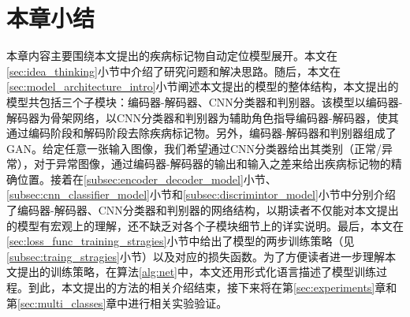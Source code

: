 \section{本章小结}\label{sec:chapter3_summary}
本章内容主要围绕本文提出的疾病标记物自动定位模型展开。本文在\ref{sec:idea_thinking}小节中介绍了研究问题和解决思路。随后，本文在\ref{sec:model_architecture_intro}小节阐述本文提出的模型的整体结构，本文提出的模型共包括三个子模块：编码器-解码器、CNN分类器和判别器。该模型以编码器-解码器为骨架网络，以CNN分类器和判别器为辅助角色指导编码器-解码器，使其通过编码阶段和解码阶段去除疾病标记物。另外，编码器-解码器和判别器组成了GAN。给定任意一张输入图像，我们希望通过CNN分类器给出其类别（正常/异常），对于异常图像，通过编码器-解码器的输出和输入之差来给出疾病标记物的精确位置。接着在\ref{subsec:encoder_decoder_model}小节、\ref{subsec:cnn_classifier_model}小节和\ref{subsec:discrimintor_model}小节中分别介绍了编码器-解码器、CNN分类器和判别器的网络结构，以期读者不仅能对本文提出的模型有宏观上的理解，还不缺乏对各个子模块细节上的详实说明。最后，本文在\ref{sec:loss_func_training_stragies}小节中给出了模型的两步训练策略（见\ref{subsec:traing_stragies}小节）以及对应的损失函数。为了方便读者进一步理解本文提出的训练策略，在算法\ref{alg:net}中，本文还用形式化语言描述了模型训练过程。到此，本文提出的方法的相关介绍结束，接下来将在第\ref{sec:experiments}章和第\ref{sec:multi_classes}章中进行相关实验验证。
